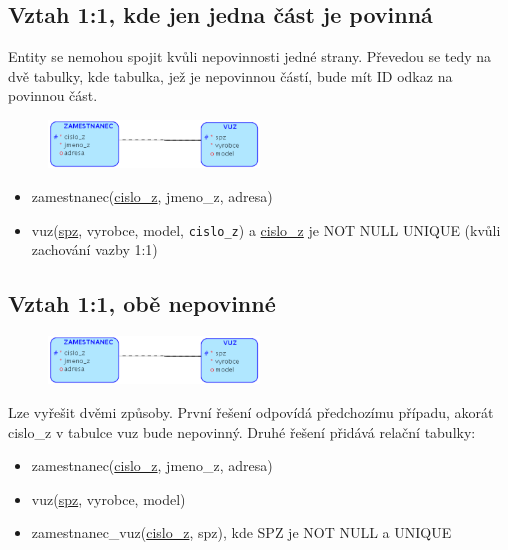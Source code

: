 \documentclass{szzclass}
\begin{document}
\subsection{Vztah 1:1, kde jen jedna část je povinná}
Entity se nemohou spojit kvůli nepovinnosti jedné strany. Převedou se tedy na dvě tabulky, kde tabulka, jež je nepovinnou částí, bude mít ID
odkaz na povinnou část.
\begin{figure}[h!]
    \centering
    \includegraphics[width=0.5\textwidth]{topics/bi-wsi-si-02/images/oneToOneV2.png}
\end{figure}
\begin{itemize}
    \item zamestnanec(\underline{cislo\_z}, jmeno\_z, adresa)
    \item vuz(\underline{spz}, vyrobce, model, \texttt{cislo\_z}) a \underline{cislo\_z} je NOT NULL UNIQUE (kvůli zachování vazby 1:1)
\end{itemize}

\subsection{Vztah 1:1, obě nepovinné}
\begin{figure}[h!]
    \centering
    \includegraphics[width=0.5\textwidth]{topics/bi-wsi-si-02/images/oneToOneV2.png}
\end{figure}
Lze vyřešit dvěmi způsoby. První řešení odpovídá předchozímu případu, akorát cislo\_z v tabulce vuz bude nepovinný.
Druhé řešení přidává relační tabulky:
\begin{itemize}
    \item zamestnanec(\underline{cislo\_z}, jmeno\_z, adresa)
    \item vuz(\underline{spz}, vyrobce, model)
    \item zamestnanec\_vuz(\underline{cislo\_z}, spz), kde SPZ je NOT NULL a UNIQUE
\end{itemize}
\end{document}
